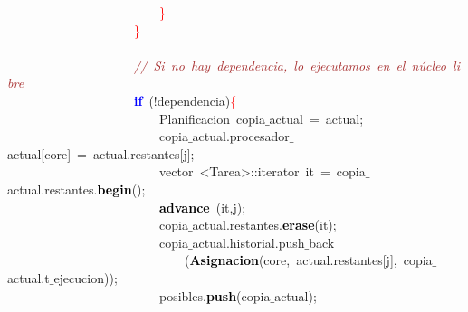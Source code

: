 \mbox{}\ \ \ \ \ \ \ \ \ \ \ \ \ \ \ \ \ \ \ \ \ \ \ \ \textcolor{Red}{\}} \\
\mbox{}\ \ \ \ \ \ \ \ \ \ \ \ \ \ \ \ \ \ \ \ \textcolor{Red}{\}} \\
\mbox{} \\
\mbox{}\ \ \ \ \ \ \ \ \ \ \ \ \ \ \ \ \ \ \ \ \textit{\textcolor{Brown}{//\ Si\ no\ hay\ dependencia,\ lo\ ejecutamos\ en\ el\ núcleo\ libre}} \\
\mbox{}\ \ \ \ \ \ \ \ \ \ \ \ \ \ \ \ \ \ \ \ \textbf{\textcolor{Blue}{if}}\ \textcolor{BrickRed}{(!}dependencia\textcolor{BrickRed}{)}\textcolor{Red}{\{} \\
\mbox{}\ \ \ \ \ \ \ \ \ \ \ \ \ \ \ \ \ \ \ \ \ \ \ \ \textcolor{TealBlue}{Planificacion}\ copia$\_$actual\ \textcolor{BrickRed}{=}\ actual\textcolor{BrickRed}{;} \\
\mbox{}\ \ \ \ \ \ \ \ \ \ \ \ \ \ \ \ \ \ \ \ \ \ \ \ copia$\_$actual\textcolor{BrickRed}{.}procesador$\_$actual\textcolor{BrickRed}{[}core\textcolor{BrickRed}{]}\ \textcolor{BrickRed}{=}\ actual\textcolor{BrickRed}{.}restantes\textcolor{BrickRed}{[}j\textcolor{BrickRed}{];} \\
\mbox{}\ \ \ \ \ \ \ \ \ \ \ \ \ \ \ \ \ \ \ \ \ \ \ \ vector\ \textcolor{BrickRed}{\textless{}}Tarea\textcolor{BrickRed}{\textgreater{}::}\textcolor{TealBlue}{iterator}\ it\ \textcolor{BrickRed}{=}\ copia$\_$actual\textcolor{BrickRed}{.}restantes\textcolor{BrickRed}{.}\textbf{\textcolor{Black}{begin}}\textcolor{BrickRed}{();} \\
\mbox{}\ \ \ \ \ \ \ \ \ \ \ \ \ \ \ \ \ \ \ \ \ \ \ \ \textbf{\textcolor{Black}{advance}}\ \textcolor{BrickRed}{(}it\textcolor{BrickRed}{,}j\textcolor{BrickRed}{);} \\
\mbox{}\ \ \ \ \ \ \ \ \ \ \ \ \ \ \ \ \ \ \ \ \ \ \ \ copia$\_$actual\textcolor{BrickRed}{.}restantes\textcolor{BrickRed}{.}\textbf{\textcolor{Black}{erase}}\textcolor{BrickRed}{(}it\textcolor{BrickRed}{);} \\
\mbox{}\ \ \ \ \ \ \ \ \ \ \ \ \ \ \ \ \ \ \ \ \ \ \ \ copia$\_$actual\textcolor{BrickRed}{.}historial\textcolor{BrickRed}{.}push$\_$back \\
\mbox{}\ \ \ \ \ \ \ \ \ \ \ \ \ \ \ \ \ \ \ \ \ \ \ \ \ \ \ \ \textcolor{BrickRed}{(}\textbf{\textcolor{Black}{Asignacion}}\textcolor{BrickRed}{(}core\textcolor{BrickRed}{,}\ actual\textcolor{BrickRed}{.}restantes\textcolor{BrickRed}{[}j\textcolor{BrickRed}{],}\ copia$\_$actual\textcolor{BrickRed}{.}t$\_$ejecucion\textcolor{BrickRed}{));} \\
\mbox{}\ \ \ \ \ \ \ \ \ \ \ \ \ \ \ \ \ \ \ \ \ \ \ \ posibles\textcolor{BrickRed}{.}\textbf{\textcolor{Black}{push}}\textcolor{BrickRed}{(}copia$\_$actual\textcolor{BrickRed}{);} \\
